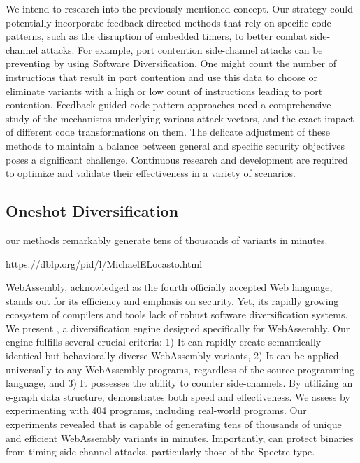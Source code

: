     
    We intend to research into the previously mentioned concept. 
    Our strategy could potentially incorporate feedback-directed methods that rely on specific code patterns, such as the disruption of embedded timers, to better combat side-channel attacks. 
    For example, port contention side-channel \cite{10.1145/3488932.3517411} attacks can be preventing by using Software Diversification. 
    One might count the number of instructions that result in port contention and use this data to choose or eliminate variants with a high or low count of instructions leading to port contention.
    Feedback-guided code pattern approaches need a comprehensive study of the mechanisms underlying various attack vectors, and the exact impact of different code transformations on them. 
    The delicate adjustment of these methods to maintain a balance between general and specific security objectives poses a significant challenge. 
    Continuous research and development are required to optimize and validate their effectiveness in a variety of scenarios.
    
    
    \subsection{Oneshot Diversification}
    
    our methods remarkably generate tens of thousands of variants in minutes. 
    
    
    \url{https://dblp.org/pid/l/MichaelELocasto.html}
    
    
WebAssembly, acknowledged as the fourth officially accepted Web language, stands out for its efficiency and emphasis on security. 
Yet, its rapidly growing ecosystem of compilers and tools lack of robust software diversification systems. 
We present \tool, a diversification engine designed specifically for WebAssembly. 
Our engine fulfills several crucial criteria: 
1) It can rapidly create semantically identical but behaviorally diverse WebAssembly variants, 
2) It can be applied universally to any WebAssembly programs, regardless of the source programming language, and 
3) It possesses the ability to counter side-channels. 
By utilizing an e-graph data structure, \tool demonstrates both speed and effectiveness.
We assess \tool by experimenting with 404 programs, including real-world programs.
Our experiments revealed that \tool is capable of generating tens of thousands of unique and efficient WebAssembly variants in minutes.
Importantly, \tool can protect \wasm binaries from timing side-channel attacks, particularly those of the Spectre type.


